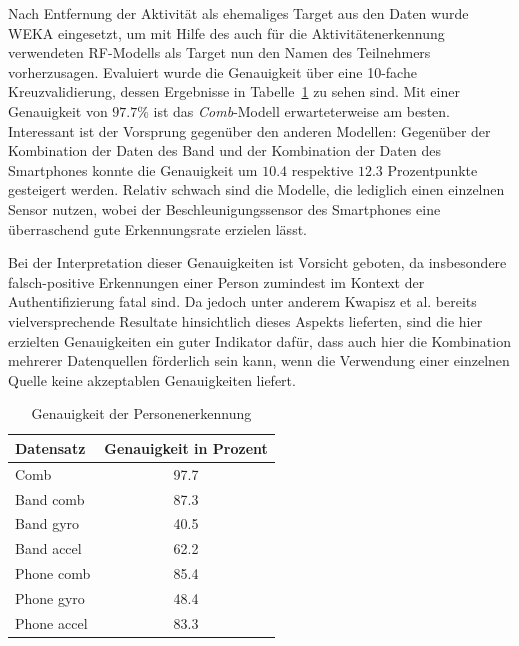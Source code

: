 Nach Entfernung der Aktivität als ehemaliges Target aus den Daten wurde WEKA eingesetzt, um mit Hilfe des auch für die Aktivitätenerkennung verwendeten \acs{RF}-Modells als Target nun den Namen des Teilnehmers vorherzusagen. Evaluiert wurde die Genauigkeit über eine 10-fache Kreuzvalidierung, dessen Ergebnisse in Tabelle~\ref{tab:user-prediction-accuracy} zu sehen sind. Mit einer Genauigkeit von $97.7 \%$ ist das \textit{Comb}-Modell erwarteterweise am besten. Interessant ist der Vorsprung gegenüber den anderen Modellen: Gegenüber der Kombination der Daten des Band und der Kombination der Daten des Smartphones konnte die Genauigkeit um $10.4$ respektive $12.3$ Prozentpunkte gesteigert werden. Relativ schwach sind die Modelle, die lediglich einen einzelnen Sensor nutzen, wobei der Beschleunigungssensor des Smartphones eine überraschend gute Erkennungsrate erzielen lässt.

Bei der Interpretation dieser Genauigkeiten ist Vorsicht geboten, da insbesondere falsch-positive Erkennungen einer Person zumindest im Kontext der Authentifizierung fatal sind. Da jedoch unter anderem Kwapisz et al. bereits vielversprechende Resultate hinsichtlich dieses Aspekts lieferten, sind die hier erzielten Genauigkeiten ein guter Indikator dafür, dass auch hier die Kombination mehrerer Datenquellen förderlich sein kann, wenn die Verwendung einer einzelnen Quelle keine akzeptablen Genauigkeiten liefert.

\begin{table}
\centering
\begin{tabular}{|l|c|}
	\hline 
	\textbf{Datensatz} & \textbf{Genauigkeit in Prozent} \\ 
	\hline 
	Comb & 97.7 \\ 
	\hline
	Band comb & 87.3 \\ 
	\hline 
	Band gyro & 40.5 \\ 
	\hline 
	Band accel & 62.2 \\ 
	\hline 
	Phone comb & 85.4 \\ 
	\hline 
	Phone gyro & 48.4 \\ 
	\hline 
	Phone accel & 83.3 \\ 
	\hline 
\end{tabular} 
\caption{Genauigkeit der Personenerkennung}
\label{tab:user-prediction-accuracy}
\end{table}

